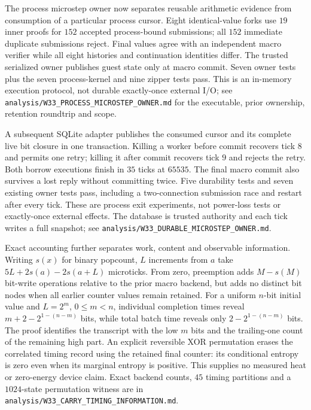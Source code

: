 The process microstep owner now separates reusable arithmetic evidence from
consumption of a particular process cursor. Eight identical-value forks use
$19$ inner proofs for $152$ accepted process-bound submissions; all $152$
immediate duplicate submissions reject. Final values agree with an independent
macro verifier while all eight histories and continuation identities differ.
The trusted serialized owner publishes guest state only at macro commit.
Seven owner tests plus the seven process-kernel and nine zipper tests pass.
This is an in-memory execution protocol, not durable exactly-once external I/O;
see \texttt{analysis/W33\_PROCESS\_MICROSTEP\_OWNER.md} for the executable,
prior ownership, retention roundtrip and scope.

A subsequent SQLite adapter publishes the consumed cursor and its complete
live bit closure in one transaction. Killing a worker before commit recovers
tick $8$ and permits one retry; killing it after commit recovers tick $9$ and
rejects the retry. Both borrow executions finish in $35$ ticks at $65535$.
The final macro commit also survives a lost reply without committing twice.
Five durability tests and seven existing owner tests pass, including a
two-connection submission race and restart after every tick. These are process
exit experiments, not power-loss tests or exactly-once external effects.
The database is trusted authority and each tick writes a full snapshot;
see \texttt{analysis/W33\_DURABLE\_MICROSTEP\_OWNER.md}.

Exact accounting further separates work, content and observable information.
Writing $s(x)$ for binary popcount, $L$ increments from $a$ take
$5L+2s(a)-2s(a+L)$ microticks. From zero, preemption adds $M-s(M)$ bit-write
operations relative to the prior macro backend, but adds no distinct bit nodes
when all earlier counter values remain retained. For a uniform $n$-bit initial
value and $L=2^m$, $0\le m<n$, individual completion times reveal
$m+2-2^{1-(n-m)}$ bits, while total batch time reveals only
$2-2^{1-(n-m)}$ bits. The proof identifies the transcript with the low $m$
bits and the trailing-one count of the remaining high part.
An explicit reversible XOR permutation erases the correlated timing record
using the retained final counter: its conditional entropy is zero even when
its marginal entropy is positive. This supplies no measured heat or zero-energy
device claim. Exact backend counts, $45$ timing partitions and a $1024$-state
permutation witness are in \texttt{analysis/W33\_CARRY\_TIMING\_INFORMATION.md}.

